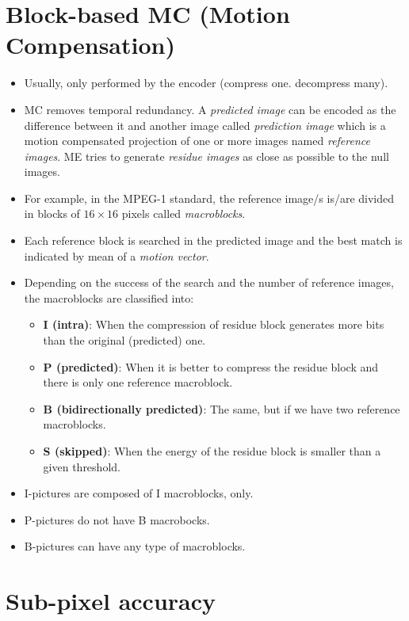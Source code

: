 \section{Block-based MC (Motion Compensation)~\cite{rao1996techniques}}
\begin{itemize}
\tightlist
\item
  Usually, only performed by the encoder (compress one. decompress
  many).
\item
  MC removes temporal redundancy. A \emph{predicted image} can be
  encoded as the difference between it and another image called
  \emph{prediction image} which is a motion compensated projection of
  one or more images named \emph{reference images}. ME tries to generate
  \emph{residue images} as close as possible to the null images.
\item
  For example, in the MPEG-1 standard, the reference image/s is/are
  divided in blocks of $16\times 16$ pixels called \emph{macroblocks}.
\item
  Each reference block is searched in the predicted image and the best
  match is indicated by mean of a \emph{motion vector}.
\item
  Depending on the success of the search and the number of reference
  images, the macroblocks are classified into:

  \begin{itemize}
  \tightlist
  \item
    \textbf{I (intra)}: When the compression of residue block generates
    more bits than the original (predicted) one.
  \item
    \textbf{P (predicted)}: When it is better to compress the residue
    block and there is only one reference macroblock.
  \item
    \textbf{B (bidirectionally predicted)}: The same, but if we have two
    reference macroblocks.
  \item
    \textbf{S (skipped)}: When the energy of the residue block is
    smaller than a given threshold.
  \end{itemize}
\item
  I-pictures are composed of I macroblocks, only.
\item
  P-pictures do not have B macrobocks.
\item
  B-pictures can have any type of macroblocks.
\end{itemize}


\section{Sub-pixel accuracy}

